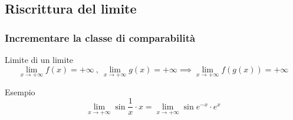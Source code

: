 \documentclass[aspectratio=149]{beamer}
\begin{document}
	\subsection{Riscrittura del limite}
	
	\begin{frame}
		\frametitle{Incrementare la classe di comparabilità}
		\begin{block}{Limite di un limite}
			\[
			\lim_{x \to +\infty}{f(x)}=+\infty \:, \: \lim_{x \to +\infty}{g(x)}=+\infty \implies \lim_{x \to +\infty}{f(g(x))}=+\infty
			\]
		\end{block}
		\begin{exampleblock}{Esempio}
			\[
				\lim_{x \to +\infty}{\sin{\frac{1}{x}} \cdot x} = \lim_{x \to +\infty}{\sin{e^{-x}} \cdot e^{x}}
			\]
		\end{exampleblock}
	\end{frame}
\end{document}
